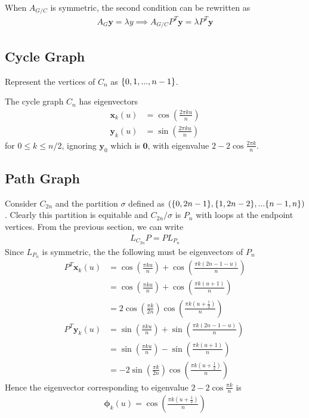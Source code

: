 \documentclass{math}
\renewcommand{\vec}[1]{\boldsymbol{#1}}
\begin{document}
When $A_{G/C}$ is symmetric, the second condition can be rewritten as
\begin{align*}
    A_G \vec{y} = \lambda y \implies A_{G/C} P^T \vec{y} = \lambda P^T \vec{y}
\end{align*}

\subsection{Cycle Graph}

Represent the vertices of $C_n$ as $\{ 0, 1, ..., n - 1 \}$.
\begin{theorem}
    The cycle graph $C_n$ has eigenvectors
    \begin{align*}
        \vec{x}_k (u) &= \cos(\frac{2\pi k u}{n}) \\
        \vec{y}_k (u) &= \sin(\frac{2\pi k u}{n})
    \end{align*}
    for $0 \leq k \leq n/2$, ignoring $\vec{y}_0$ which is $\vec{0}$,
    with eigenvalue $2 - 2 \cos \frac{2\pi k}{n}$.
\end{theorem}

\subsection{Path Graph}

Consider $C_{2n}$ and the partition $\sigma$ defined as $(\{ 0, 2n - 1 \}, \{ 1, 2n - 2 \}, ... \{ n - 1, n \})$.
Clearly this partition is equitable and $C_{2n}/\sigma$ is $P_n$ with loops at the endpoint vertices.
From the previous section, we can write
\begin{align*}
    L_{C_{2n}} P = P L_{P_n}
\end{align*}
Since $L_{P_n}$ is symmetric, the the following must be eigenvectors of $P_n$
\begin{align*}
    P^T \vec{x}_k(u) &= \cos(\frac{\pi k u}{n}) + \cos(\frac{\pi k (2n - 1 - u)}{n}) \\
    &= \cos(\frac{\pi k u}{n}) + \cos(\frac{\pi k (u + 1)}{n}) \\
    &= 2 \cos(\frac{\pi k}{2n}) \cos(\frac{\pi k (u + \frac{1}{2})}{n}) \\
    P^T \vec{y}_k(u) &= \sin(\frac{\pi k u}{n}) + \sin(\frac{\pi k (2n - 1 - u)}{n}) \\
    &= \sin(\frac{\pi k u}{n}) - \sin(\frac{\pi k (u + 1)}{n}) \\
    &= - 2 \sin(\frac{\pi k}{2n}) \cos(\frac{\pi k (u + \frac{1}{2})}{n})
\end{align*}
Hence the eigenvector corresponding to eigenvalue $2 - 2 \cos\frac{\pi k}{n}$ is
\begin{align*}
    \vec{\phi}_k (u) = \cos(\frac{\pi k (u + \frac{1}{2})}{n})
\end{align*}
\end{document}
